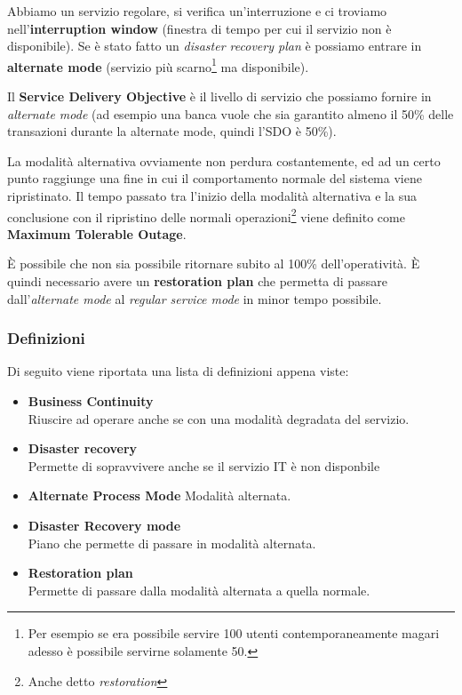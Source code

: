 Abbiamo un servizio regolare, si verifica un'interruzione e ci troviamo 
nell'\textbf{interruption window} (finestra di tempo per cui il servizio non è 
disponibile). Se è stato fatto un \textit{disaster recovery plan} è 
possiamo entrare in \textbf{alternate mode} (servizio più scarno\footnote{Per 
esempio se era possibile servire 100 utenti contemporaneamente magari adesso 
\`e possibile servirne solamente 50.} ma disponibile).

Il \textbf{Service Delivery Objective} è il livello di servizio che possiamo 
fornire in \textit{alternate mode} (ad esempio una banca vuole che sia 
garantito almeno il 50\% delle transazioni durante la alternate mode, quindi 
l'SDO è 50\%).

La modalità alternativa ovviamente non perdura costantemente, ed ad un certo 
punto raggiunge una fine in cui il comportamento normale del sistema viene 
ripristinato. Il tempo passato tra l'inizio della modalità alternativa e la 
sua conclusione con il ripristino delle normali operazioni\footnote{Anche 
detto \textit{restoration}} viene definito come \textbf{Maximum Tolerable 
Outage}.

È possibile che non sia possibile ritornare subito al 100\% dell'operatività. 
È quindi necessario avere un \textbf{restoration plan} che permetta di passare 
dall'\textit{alternate mode} al \textit{regular service mode} in minor tempo 
possibile.

\subsubsection{Definizioni}

Di seguito viene riportata una lista di definizioni appena viste:

\begin{itemize}
 \item \textbf{Business Continuity} \\
 Riuscire ad operare anche se con una modalità degradata del servizio.
 \item \textbf{Disaster recovery} \\
 Permette di sopravvivere anche se il servizio IT è non disponbile
 \item \textbf{Alternate Process Mode} 
 Modalità alternata.
 \item \textbf{Disaster Recovery mode} \\
 Piano che permette di passare in modalità alternata.
 \item \textbf{Restoration plan} \\
 Permette di passare dalla modalità alternata a quella normale.
\end{itemize}

